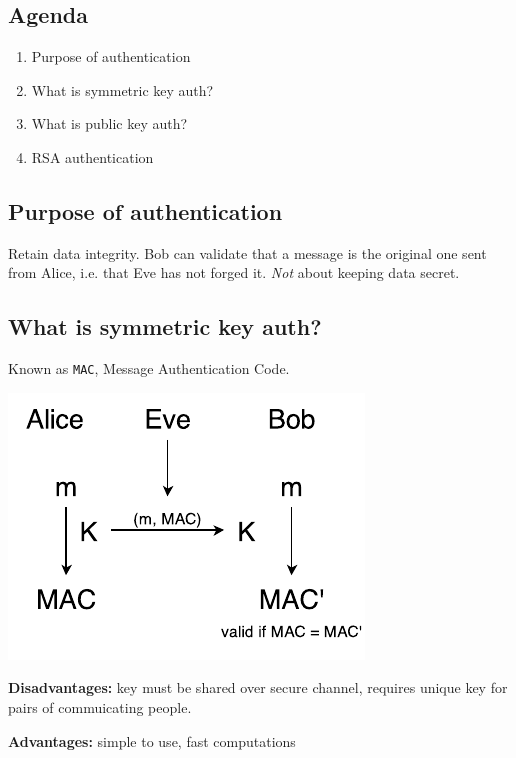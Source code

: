 

\subsection*{Agenda}
\begin{enumerate}
\item Purpose of authentication
\item What is symmetric key auth?
\item What is public key auth?
\item RSA authentication
\end{enumerate}

\subsection{Purpose of authentication}
Retain data integrity. Bob can validate that a message is the original one sent from Alice, i.e. that Eve has not forged it. \emph{Not} about keeping data secret.

\subsection{What is symmetric key auth?}
Known as \texttt{MAC}, Message Authentication Code.

\begin{center}
\includegraphics{images/2-sym-AB.pdf}
\end{center}

\textbf{Disadvantages:} key must be shared over secure channel, requires unique key for pairs of commuicating people.

\textbf{Advantages:} simple to use, fast computations

